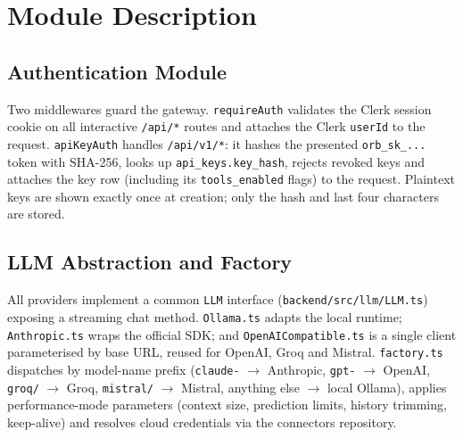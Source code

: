 \documentclass[12pt,a4paper,oneside]{report}
\begin{document}
\section{Module Description}

\subsection{Authentication Module}
Two middlewares guard the gateway. \texttt{requireAuth} validates the
Clerk session cookie on all interactive \texttt{/api/*} routes and
attaches the Clerk \texttt{userId} to the request.
\texttt{apiKeyAuth} handles \texttt{/api/v1/*}: it hashes the
presented \texttt{orb\_sk\_...} token with SHA-256, looks up
\texttt{api\_keys.key\_hash}, rejects revoked keys and attaches the
key row (including its \texttt{tools\_enabled} flags) to the request.
Plaintext keys are shown exactly once at creation; only the hash and
last four characters are stored.

\subsection{LLM Abstraction and Factory}
All providers implement a common \texttt{LLM} interface
(\texttt{backend/src/llm/LLM.ts}) exposing a streaming chat method.
\texttt{Ollama.ts} adapts the local runtime;
\texttt{Anthropic.ts} wraps the official SDK; and
\texttt{OpenAICompatible.ts} is a single client parameterised by base
URL, reused for OpenAI, Groq and Mistral. \texttt{factory.ts}
dispatches by model-name prefix (\texttt{claude-} $\rightarrow$
Anthropic, \texttt{gpt-} $\rightarrow$ OpenAI, \texttt{groq/}
$\rightarrow$ Groq, \texttt{mistral/} $\rightarrow$ Mistral, anything
else $\rightarrow$ local Ollama), applies performance-mode parameters
(context size, prediction limits, history trimming, keep-alive) and
resolves cloud credentials via the connectors repository.
\end{document}
